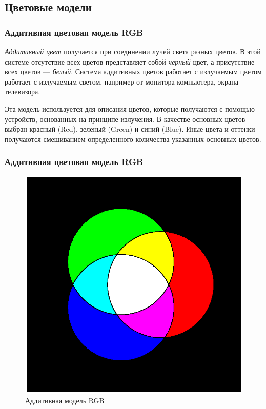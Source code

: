 \subsection{Цветовые модели}
\begin{frame}
\frametitle{Аддитивная цветовая модель RGB}
\textit{Аддитивный цвет} получается при соединении лучей света разных цветов. В этой системе отсутствие всех цветов представляет собой \textit{черный} цвет, а присутствие всех цветов --- \textit{белый}. Система аддитивных цветов работает с излучаемым цветом работает с излучаемым светом, например от монитора компьютера, экрана телевизора.

Эта модель используется для описания цветов, которые получаются с помощью устройств, основанных на принципе излучения. В качестве основных цветов выбран красный (Red), зеленый (Green) и синий (Blue). Иные цвета и оттенки получаются смешиванием определенного количества указанных основных цветов.
\end{frame}
\begin{frame}
\frametitle{Аддитивная цветовая модель RGB}

\begin{figure}[htbp] \begin{center}
\includegraphics{images/part14}
\caption{Аддитивная модель RGB} 
\end{center} \end{figure}
\end{frame}



